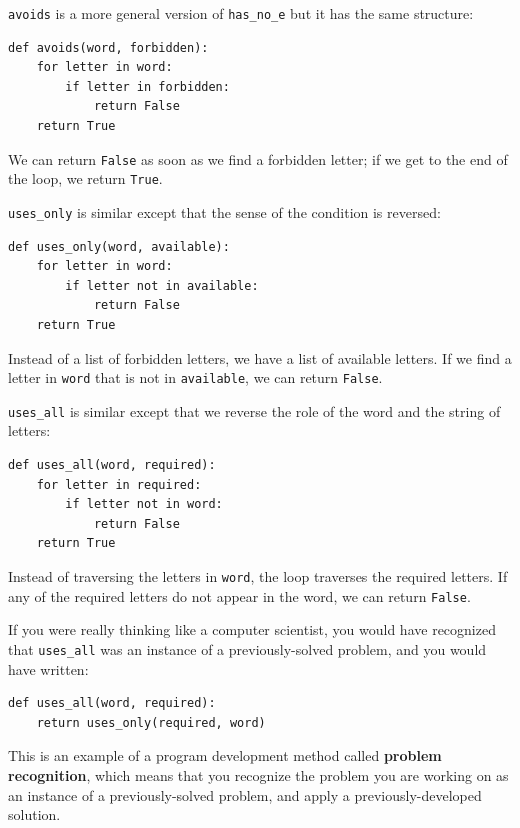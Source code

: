 \documentclass[10pt]{book}
\begin{document}


{\tt avoids} is a more general version of \verb"has_no_e" but it
has the same structure:

\begin{verbatim}
def avoids(word, forbidden):
    for letter in word:
        if letter in forbidden:
            return False
    return True
\end{verbatim}
%
We can return {\tt False} as soon as we find a forbidden letter;
if we get to the end of the loop, we return {\tt True}.

\verb"uses_only" is similar except that the sense of the condition
is reversed:

\begin{verbatim}
def uses_only(word, available):
    for letter in word:
        if letter not in available:
            return False
    return True
\end{verbatim}
%
Instead of a list of forbidden letters, we have a list of available
letters.  If we find a letter in {\tt word} that is not in
{\tt available}, we can return {\tt False}.

\verb"uses_all" is similar except that we reverse the role
of the word and the string of letters:

\begin{verbatim}
def uses_all(word, required):
    for letter in required:
        if letter not in word:
            return False
    return True
\end{verbatim}
%
Instead of traversing the letters in {\tt word}, the loop
traverses the required letters.  If any of the required letters
do not appear in the word, we can return {\tt False}.

If you were really thinking like a computer scientist, you would
have recognized that \verb"uses_all" was an instance of a
previously-solved problem, and you would have written:

\begin{verbatim}
def uses_all(word, required):
    return uses_only(required, word)
\end{verbatim}
%
This is an example of a program development method called {\bf problem
recognition}, which means that you recognize the problem you are
working on as an instance of a previously-solved problem, and apply a
previously-developed solution.
\end{document}
